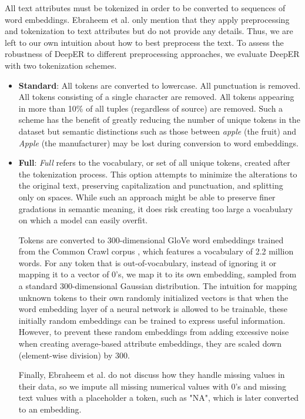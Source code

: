 \documentclass{proc}
\begin{document}
All text attributes must be tokenized in order to be converted to sequences of word embeddings. Ebraheem et al. \cite{ebraheem-deep-er} only mention that they apply preprocessing and tokenization to text attributes but do not provide any details. Thus, we are left to our own intuition about how to best preprocess the text. To assess the robustness of DeepER to different preprocessing approaches, we evaluate DeepER with two tokenization schemes.
\begin{itemize}
\item{\textbf{Standard}: All tokens are converted to lowercase. All punctuation is removed. All tokens consisting of a single character are removed. All tokens appearing in more than 10\% of all tuples (regardless of source) are removed. Such a scheme has the benefit of greatly reducing the number of unique tokens in the dataset but semantic distinctions such as those between \textit{apple} (the fruit) and \textit{Apple} (the manufacturer) may be lost during conversion to word embeddings.}
\item{\textbf{Full}: \textit{Full} refers to the vocabulary, or set of all unique tokens, created after the tokenization process. This option attempts to minimize the alterations to the original text, preserving capitalization and punctuation, and splitting only on spaces. While such an approach might be able to preserve finer gradations in semantic meaning, it does risk creating too large a vocabulary on which a model can easily overfit.}

Tokens are converted to 300-dimensional GloVe word embeddings trained from the Common Crawl corpus \cite{pennington-glove}, which features a vocabulary of 2.2 million words. For any token that is out-of-vocabulary, instead of ignoring it or mapping it to a vector of $0$'s, we map it to its own embedding, sampled from a standard 300-dimensional Gaussian distribution. The intuition for mapping unknown tokens to their own randomly initialized vectors is that when the word embedding layer of a neural network is allowed to be trainable, these initially random embeddings can be trained to express useful information. However, to prevent these random embeddings from adding excessive noise when creating average-based attribute embeddings, they are scaled down (element-wise division) by 300.

Finally, Ebraheem et al. \cite{ebraheem-deep-er} do not discuss how they handle missing values in their data, so we impute all missing numerical values with $0$'s and missing text values with a placeholder a token, such as "NA", which is later converted to an embedding.

\end{itemize}
\end{document}
